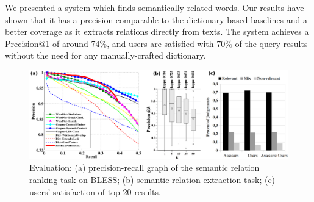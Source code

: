 \documentclass[runningheads,a4paper]{llncs}
\begin{document}
We presented a system which finds semantically related words. Our results have shown that it has a precision comparable to the dictionary-based baselines and a better coverage as it extracts relations directly from texts. The system achieves a Precision@1 of around 74\%, and users are satisfied with 70\% of the query results without the need for any manually-crafted dictionary.

\begin{figure}
	\centering
		\includegraphics[width=1.0\textwidth]{figures/eval2}		
		\caption{ Evaluation: (a) precision-recall graph of the semantic relation ranking task on BLESS; (b) semantic relation extraction task; (c) users' satisfaction of top 20 results. }
	\label{fig:eval}
\end{figure}



\end{document}
